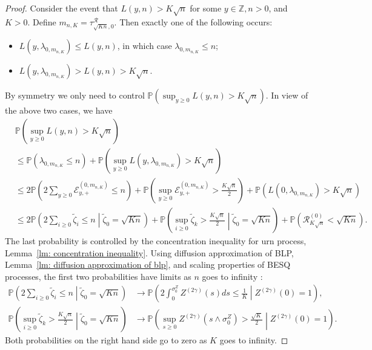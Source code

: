 \documentclass[EJP]{ejpecp} %
\begin{document}
\begin{proof}
	Consider the event that $L(y, n) > K \sqrt{n} $ for some $y \in \mathbb{Z}, n>0$, and $K > 0$. Define $m_{n, K } = \tau^{\mathscr{R}}_{\sqrt{K n},0 }$. Then exactly one of the following occurs:
	\begin{itemize}
		\item $L(y, \lambda_{0, m_{n, K}}) \le L(y, n)$, in which case $\lambda_{0, m_{n, K}} \le  n$;
		\item $L(y, \lambda_{0, m_{n, K}}) >  L(y, n)  > K \sqrt{n} $.
	\end{itemize}
	By symmetry we only need to control $\mathbb{P}\left( \sup _{y \ge  0} L(y, n) > K \sqrt{n}  \right) $. In view of the above two cases, we have
	\begin{align*}
		&\mathbb{P}\left( \sup _{y \ge  0} L(y, n) > K \sqrt{n}  \right) \\
		&\le \mathbb{P}\left( \lambda_{0, m_{n, K}} \le n \right) + \mathbb{P}\left( \sup _{y \ge 0} L\left( y, \lambda_{0, m_{n, K}}\right)   > K \sqrt{n}  \right)  \\
		&\le 2\mathbb{P}\left( 2 \sum_{y \ge 0} \mathcal{E}_{y, +}^{(0,m_{n, K})} \le n \right) + \mathbb{P}\left( \sup _{y \ge 0} \mathcal{E}_{y,+}^{\left( 0,m_{n, K} \right) }   > \frac{K \sqrt{n} }{2}  \right)+ \mathbb{P}\left( L(0,\lambda_{0, m_{n, K}}) > K \sqrt{n}  \right)  \\
		&\le 
		2\mathbb{P}\left( 2 \sum_{i \ge  0} \tilde \zeta_i \le  n \middle| \tilde\zeta_0 = \sqrt{K n} \right) + 
		\mathbb{P}\left( \sup _{i \ge 0} \tilde \zeta_k > \frac{K \sqrt{n} }{2} \middle| \tilde \zeta_0 = \sqrt{K n}   \right)+ 
		\mathbb{P}\left( \mathscr{R}^{(0)} _{K \sqrt{n} } < \sqrt{K n}  \right) 
		.\end{align*}
	The last probability is controlled by the concentration inequality for urn process, Lemma~\ref{lm: concentration inequality}. Using diffusion approximation of BLP, Lemma~\ref{lm: diffusion approximation of blp}, and scaling properties of BESQ processes, the first two probabilities have limits as $n$ goes to infinity :
	\begin{align*}
		\mathbb{P}\left( 2 \sum_{i \ge  0} \tilde \zeta_i \le  n \middle| \tilde\zeta_0 = \sqrt{K n} \right) 
		&\to 
		\mathbb{P}\left(2 \int _0^{\sigma_0^{Z}} Z^{(2 \gamma)}(s) d s \le \frac{1}{K} \middle| Z^{(2 \gamma)}(0) = 1 \right),\\
		\mathbb{P}\left( \sup _{i \ge 0} \tilde \zeta_k > \frac{K \sqrt{n} }{2} \middle| \tilde \zeta_0 = \sqrt{K n}   \right)
		&\to 
		\mathbb{P}\left( \sup_{s \ge 0} Z^{(2 \gamma)}(s \wedge \sigma_0^{Z}) > \frac{\sqrt{K} }{2} \middle| Z^{(2 \gamma)} (0) = 1 \right) 
		.\end{align*} 
	Both probabilities on the right hand side go to zero as $K$ goes to infinity. 
\end{proof}
\end{document}
